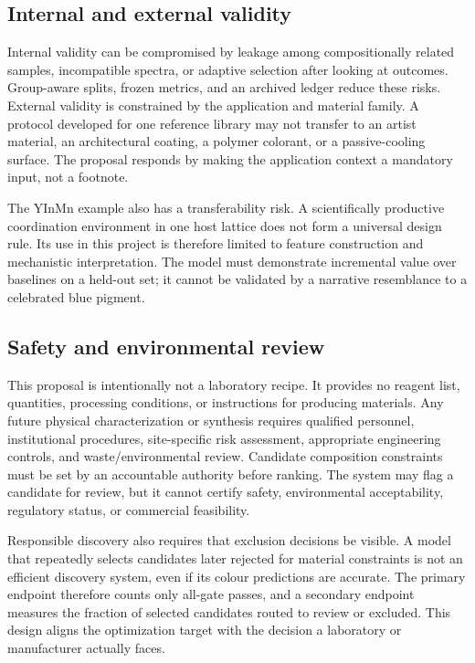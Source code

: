 \documentclass[conference]{IEEEtran}
\begin{document}
\subsection{Internal and external validity}

Internal validity can be compromised by leakage among compositionally related samples, incompatible spectra, or adaptive selection after looking at outcomes. Group-aware splits, frozen metrics, and an archived ledger reduce these risks. External validity is constrained by the application and material family. A protocol developed for one reference library may not transfer to an artist material, an architectural coating, a polymer colorant, or a passive-cooling surface. The proposal responds by making the application context a mandatory input, not a footnote.

The YInMn example also has a transferability risk. A scientifically productive coordination environment in one host lattice does not form a universal design rule. Its use in this project is therefore limited to feature construction and mechanistic interpretation. The model must demonstrate incremental value over baselines on a held-out set; it cannot be validated by a narrative resemblance to a celebrated blue pigment.

\subsection{Safety and environmental review}

This proposal is intentionally not a laboratory recipe. It provides no reagent list, quantities, processing conditions, or instructions for producing materials. Any future physical characterization or synthesis requires qualified personnel, institutional procedures, site-specific risk assessment, appropriate engineering controls, and waste/environmental review. Candidate composition constraints must be set by an accountable authority before ranking. The system may flag a candidate for review, but it cannot certify safety, environmental acceptability, regulatory status, or commercial feasibility.

Responsible discovery also requires that exclusion decisions be visible. A model that repeatedly selects candidates later rejected for material constraints is not an efficient discovery system, even if its colour predictions are accurate. The primary endpoint therefore counts only all-gate passes, and a secondary endpoint measures the fraction of selected candidates routed to review or excluded. This design aligns the optimization target with the decision a laboratory or manufacturer actually faces.
\end{document}
